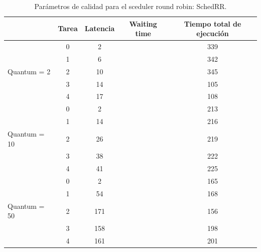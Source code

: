 \begin{table}[h!]
	\begin{center}
		\caption{Parámetros de calidad para el sceduler round robin: SchedRR.}
		\label{tab:table1}
		\begin{tabular}{|l|c|c|c|c|}
			\hline
			& Tarea & Latencia & Waiting time & Tiempo total de ejecución \\
			\hline
			\hline
			& 0 & 2 & & 339 \\ \cline{2-5}
			& 1 & 6 & & 342\\ \cline{2-5}
			Quantum = 2 & 2 & 10 & & 345 \\ \cline{2-5}
			& 3 & 14 & & 105 \\ \cline{2-5}
			& 4 & 17 & & 108 \\ 
			\hline
			\hline
			& 0 & 2 & & 213 \\ \cline{2-5}
			& 1 & 14 & & 216 \\ \cline{2-5}
			Quantum = 10 & 2 & 26 & & 219\\ \cline{2-5}
			& 3 & 38 & & 222 \\ \cline{2-5}
			& 4 & 41 & & 225 \\ 
			\hline
			\hline
			& 0 & 2 & & 165 \\ \cline{2-5}
			& 1 & 54 & & 168 \\ \cline{2-5}
			Quantum = 50 & 2 & 171 & & 156 \\ \cline{2-5}
			& 3 & 158 & & 198 \\ \cline{2-5}
			& 4 & 161 & & 201 \\
			\hline
		\end{tabular}
	\end{center}
\end{table}
